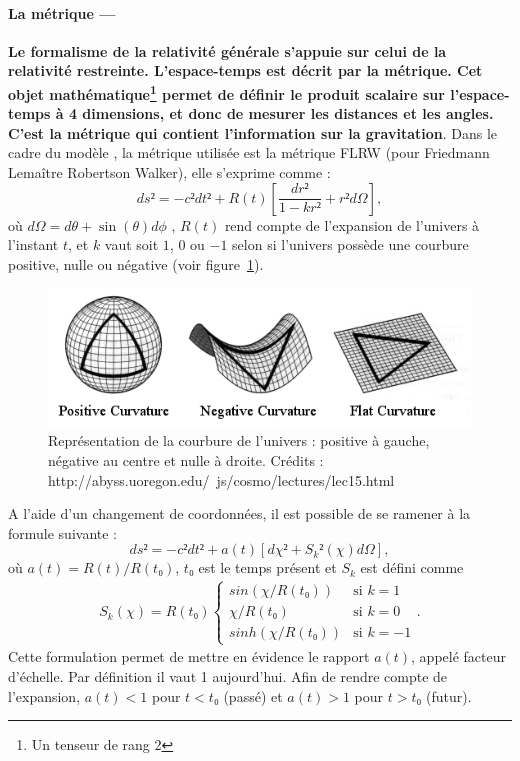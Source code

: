 \documentclass[11pt, twoside, a4paper, openright]{report}
\begin{document}
\paragraph{La métrique —}
\textbf{Le formalisme de la relativité générale s'appuie sur celui de la relativité restreinte. L'espace-temps est décrit par la métrique. Cet objet mathématique\footnote{Un tenseur de rang 2} permet de définir le produit scalaire sur l'espace-temps à 4 dimensions, et donc de mesurer les distances et les angles. C'est la métrique qui contient l'information sur la gravitation}. Dans le cadre du modèle \lcdm{}, la métrique utilisée est la métrique FLRW (pour Friedmann Lemaître Robertson Walker), elle s'exprime comme :
\begin{equation}
  \label{eq:metrique1}
  ds² = - c² dt² + R(t) \left[ \frac{dr²}{1 - k r²} + r² d\Omega \right],
\end{equation}
où $d\Omega = d\theta + \sin(\theta) d\phi$ , $R(t)$ rend compte de l'expansion de l'univers à l'instant $t$, et $k$ vaut soit $1$, $0$ ou $-1$ selon si l'univers possède une courbure positive, nulle ou négative (voir figure~\ref{fig:curvature}).
\begin{figure}
  \centering
  \includegraphics[scale=0.6]{curvature}
  \caption{Représentation de la courbure de l'univers : positive à gauche, négative au centre et nulle à droite. Crédits : http://abyss.uoregon.edu/~js/cosmo/lectures/lec15.html}
  \label{fig:curvature}
\end{figure}
A l'aide d'un changement de coordonnées, il est possible de se ramener à la formule suivante :
\begin{equation}
  \label{eq:metrique2}
  ds² = - c² dt² + a(t)\left[ d\chi² + S_{k}²(\chi) d\Omega \right],
\end{equation}
où $a(t) = R(t) / R(t₀)$,  $t₀$ est le temps présent et $S_{k}$ est défini comme
\begin{align}
  S_{k}(\chi) = R(t₀) \left\{
    \begin{array}{ll}
      sin(\chi / R(t₀)) & \mbox{si } k = 1 \\
      \chi / R(t₀) & \textrm{si } k = 0 \\
      sinh(\chi / R(t₀)) & \mbox{si } k = -1
    \end{array}
\right..
\end{align}
Cette formulation permet de mettre en évidence le rapport $a(t)$, appelé facteur d'échelle. Par définition il vaut 1 aujourd'hui. Afin de rendre compte de l'expansion, $a(t) < 1$ pour $t < t₀$ (passé) et $a(t) > 1$ pour $t > t₀$ (futur).
\end{document}
